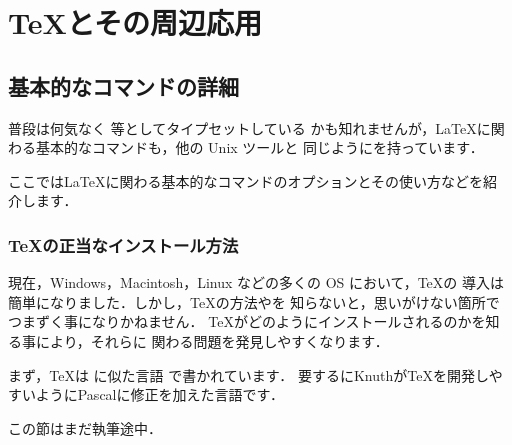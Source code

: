 ﻿%
\chapter{\TeX とその周辺\zdash 応用}

\begin{abstract}
いつも何気なく呪文のように呼び出している\LaTeX コマンドたち．
この章では，\LaTeX 周辺の日陰で過ごすプログラムたちに焦点を
当ててみようと思います．
\end{abstract}

\section{基本的なコマンドの詳細}
普段は何気なく  等としてタイプセットしている
かも知れませんが，\LaTeX に関わる基本的なコマンドも，他の Unix ツールと
同じようにを持っています．

ここでは\LaTeX に関わる基本的なコマンドのオプションとその使い方などを紹
介します．

\subsection{\TeX の正当なインストール方法}
現在，Windows，Macintosh，Linux などの多くの OS において，\TeX の
導入は簡単になりました．しかし，\TeX の方法やを
知らないと，思いがけない箇所でつまずく事になりかねません．
\TeX がどのようにインストールされるのかを知る事により，それらに
関わる問題を発見しやすくなります．

まず，\TeX は  に似た言語  で書かれています．
要するにKnuthが\TeX を開発しやすいようにPascalに修正を加えた言語です．

\begin{append}
 この節はまだ執筆途中．
\end{append}





